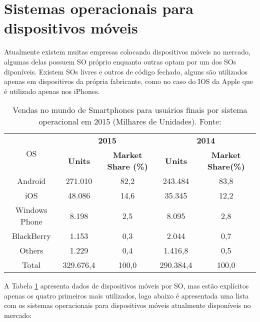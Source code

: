 \section{Sistemas operacionais para dispositivos móveis}
Atualmente existem muitas empresas colocando dispositivos móveis no mercado, algumas delas possuem SO próprio enquanto outras optam por um dos SOs diponíveis.
Existem SOs livres e outros de código fechado, alguns são utilizados apenas em dispositivos da própria fabricante, como no caso do IOS da Apple que é utilizado apenas nos iPhones.

\begin{table}[ph]
	\footnotesize
	\centering
	\caption[Sistemas operacionais mais utilizados]{Vendas no mundo de Smartphones para usuários finais por sistema operacional em 2015 (Milhares de Unidades). Fonte: \cite{gartner}}
	\begin{tabular}{|*5{c|}}
		\hline
		\multirow{2}{*}{OS} & \multicolumn{2}{|c|}{\textbf{2015}} & \multicolumn{2}{|c|}{\textbf{2014}}\\ \hhline{~----}
		 & \textbf{Units}  & \textbf{Market Share (\%)} & \textbf{Units}  & \textbf{Market Share(\%)}\\ \hline \SPACE
		Android & 271.010 & 82,2 & 243.484 & 83,8\\ \hline \SPACE
		iOS & 48.086 & 14,6 & 35.345 & 12,2\\ \hline \SPACE
		Windows Phone & 8.198 & 2,5 & 8.095 & 2,8\\ \hline \SPACE
		BlackBerry & 1.153 & 0,3 & 2.044 & 0,7\\ \hline \SPACE
		Others & 1.229 & 0,4 & 1.416,8 & 0,5\\ \hline \SPACE
		Total & 329.676,4 & 100,0 & 290.384,4 & 100,0\\
		\hline
	\end{tabular}
	\label{tab:OS}
\end{table}

A Tabela \ref{tab:OS} apresenta dados de dispositivos móveis por SO, mas estão explícitos apenas os quatro primeiros mais utilizados, logo abaixo é apresentada uma lista com os sistemas operacionais para dispositivos móveis atualmente disponíveis no mercado:

